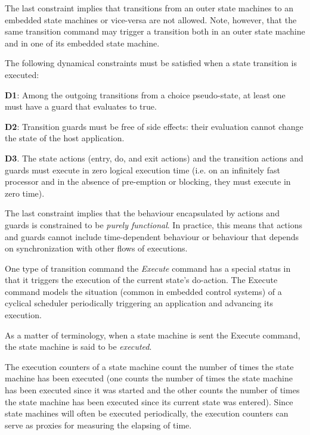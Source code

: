 The last constraint implies that transitions from an outer state machines to an embedded state machines or vice-versa are not allowed. Note, however, 
that the same transition command may trigger a transition both in an outer state machine and in one of its embedded state machine. 

The following dynamical constraints must be satisfied when a state transition is executed: 

\begin{fw_itemize}
\item{\textbf{D1}}: Among the outgoing transitions from a choice pseudo-state, at least one must have a guard that evaluates to true.
\item{\textbf{D2}}: Transition guards must be free of side effects: their evaluation cannot change the state of the host application.
\item{\textbf{D3}}. The state actions (entry, do, and exit actions) and the transition actions and guards must execute
in zero logical execution time (i.e. on an infinitely fast processor and in the absence of pre-emption or blocking, 
they must execute in zero time).
\end{fw_itemize}

The last constraint implies that the behaviour encapsulated by actions and guards is
constrained to be \emph{purely functional}. In practice, this means that actions and guards cannot
include time-dependent behaviour or behaviour that depends on synchronization with other
flows of executions.

One type of transition command the \emph{Execute} command has a special status in that it triggers the execution of the current state's do-action. 
The Execute command models the situation (common in embedded control systems) of a cyclical scheduler periodically triggering 
an application and advancing its execution.

As a matter of terminology, when a state machine is sent the Execute command, the state
machine is said to be \emph{executed}.

The execution counters of a state machine count the number of times the state machine has
been executed (one counts the number of times the state machine has been executed since it 
was started and the other counts the number of times the state machine has been executed
since its current state was entered). Since state machines will often be executed periodically,
the execution counters can serve as proxies for measuring the elapsing of time.


